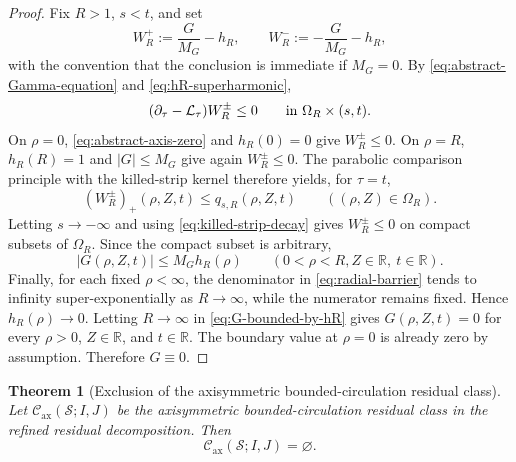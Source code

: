 \documentclass[11pt]{amsart}
\numberwithin{equation}{section}
\theoremstyle{plain}
\newtheorem{theorem}{Theorem}[section]
\theoremstyle{definition}
\theoremstyle{remark}
\newcommand{\Cax}{\mathcal C_{\mathrm{ax}}}
\begin{document}
\begin{proof}
Fix \(R>1\), \(s<t\), and set
\[
   W^+_{R}:=\frac{G}{M_G}-h_R,
   \qquad
   W^-_{R}:=-\frac{G}{M_G}-h_R,
\]
with the convention that the conclusion is immediate if \(M_G=0\).
By \eqref{eq:abstract-Gamma-equation} and \eqref{eq:hR-superharmonic},
\[
   (\partial_\tau-\mathcal L_\tau)W_R^\pm\le0
   \qquad\hbox{in }\Omega_R\times(s,t).
\]
On \(\rho=0\), \eqref{eq:abstract-axis-zero} and \(h_R(0)=0\) give
\(W_R^\pm\le0\).  On \(\rho=R\), \(h_R(R)=1\) and \(|G|\le M_G\) give again
\(W_R^\pm\le0\).  The parabolic comparison principle with the killed-strip
kernel therefore yields, for \(\tau=t\),
\[
   (W_R^\pm)_+(\rho,Z,t)
   \le q_{s,R}(\rho,Z,t)
   \qquad ((\rho,Z)\in\Omega_R).
\]
Letting \(s\to-\infty\) and using \eqref{eq:killed-strip-decay} gives
\(W_R^\pm\le0\) on compact subsets of \(\Omega_R\).  Since the compact subset
is arbitrary,
\begin{equation}\label{eq:G-bounded-by-hR}
   |G(\rho,Z,t)|\le M_G h_R(\rho)
   \qquad (0<\rho<R, Z\in\mathbb R,
   \ t\in\mathbb R).
\end{equation}
Finally, for each fixed \(\rho<\infty\), the denominator in
\eqref{eq:radial-barrier} tends to infinity super-exponentially as
\(R\to\infty\), while the numerator remains fixed.  Hence
\(h_R(\rho)\to0\).  Letting \(R\to\infty\) in
\eqref{eq:G-bounded-by-hR} gives \(G(\rho,Z,t)=0\) for every
\(\rho>0\), \(Z\in\mathbb R\), and \(t\in\mathbb R\).  The boundary value at
\(\rho=0\) is already zero by assumption.  Therefore \(G\equiv0\).
\end{proof}

\begin{theorem}[Exclusion of the axisymmetric bounded-circulation residual class]
\label{thm:R1-exclusion}
Let \(\Cax(\mathcal S;I,J)\) be the axisymmetric bounded-circulation residual
class in the refined residual decomposition.  Then
\begin{equation}\label{eq:R1-empty}
   \Cax(\mathcal S;I,J)=\varnothing .
\end{equation}
\end{theorem}
\end{document}
